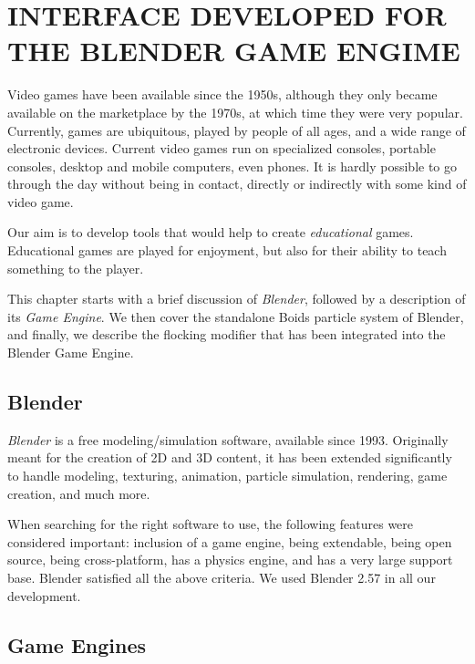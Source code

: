 \chapter{INTERFACE DEVELOPED FOR THE BLENDER GAME ENGIME}\label{chap5}


Video games have been available since the 1950s\cite{historyVideoGames}, although they only  became available on the marketplace by the 1970s, at which time they were very popular. Currently, games are ubiquitous, played by people of all ages, and a wide range of electronic devices. Current video games run on specialized consoles, portable consoles, desktop and mobile computers, even phones. It is hardly possible to go through the day without being in contact, directly or indirectly with some kind of video game.

Our aim is to develop tools that would help to create \textit{educational} games. Educational games are played for enjoyment, but also for their ability to teach something to the player. 

This chapter starts with a brief discussion of \textit{Blender}, followed by a description of its \textit{Game Engine}. We then cover the standalone Boids particle system of Blender, and finally, we describe the flocking modifier that has been integrated into the Blender Game Engine. 


\section{Blender}\label{blenderSec}
\textit{Blender}\cite{blenderWeb} is a free modeling/simulation software, available since 1993. Originally meant for the creation of 2D and 3D content, it has been extended significantly to handle modeling, texturing, animation, particle simulation, rendering, game creation, and much more. 

When searching for the right software to use, the following features were considered important: inclusion of a game engine, being extendable, being open source, being cross-platform, has a physics engine, and has a very large support base. Blender satisfied all the above criteria. We used Blender 2.57 in all our development. 

\section{Game Engines}

